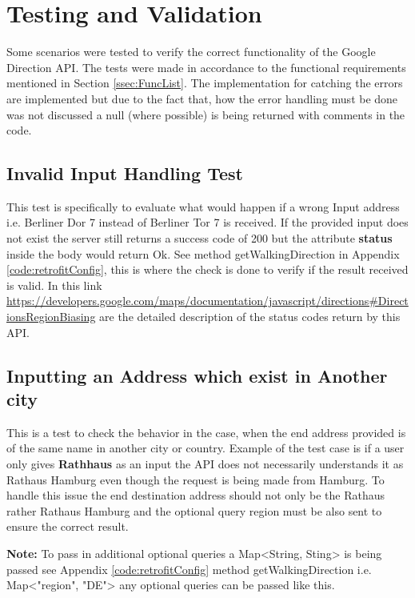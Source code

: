 \chapter{Testing and Validation}
Some scenarios were tested to verify the
correct functionality of the Google Direction
API. The tests were made in accordance
to the functional requirements mentioned
in Section \ref{ssec:FuncList}. The implementation for 
catching the errors are implemented but due to the fact that,
how the error handling must be done was not discussed a null (where possible) 
is being returned with comments in the code.

\section{Invalid Input Handling Test}
    This test is specifically to evaluate what would happen if a wrong Input address i.e. 
    Berliner Dor 7 instead of Berliner Tor 7 is received. If the provided input does not exist
    the server still returns a success code of 200 but the attribute \textbf{status} inside the body
    would return Ok. See method getWalkingDirection in Appendix 
    \ref{code:retrofitConfig}, this is where the check is done to verify
    if the result received is valid. In this link 
    \url{https://developers.google.com/maps/documentation/javascript/directions#DirectionsRegionBiasing} 
     are the detailed description of the status codes return by this API.

\section{Inputting an Address which exist in Another city}
    This is a test to check the behavior in the case, when the 
    end address provided is of the same name in another city or country. 
    Example of the test case is if a user only gives \textbf{Rathhaus} 
    as an input the API does not necessarily understands it as Rathaus Hamburg 
    even though the request is being made from Hamburg.
    To handle this issue the end destination address should not only
    be the Rathaus rather Rathaus Hamburg and the optional
    query region must be also sent to ensure the correct
    result. 
    
    \textbf{Note: }To pass in additional optional queries a Map<String, Sting>
    is being passed see Appendix \ref{code:retrofitConfig} method getWalkingDirection
    i.e. Map<"region", "DE"> any optional queries can be passed like this.

